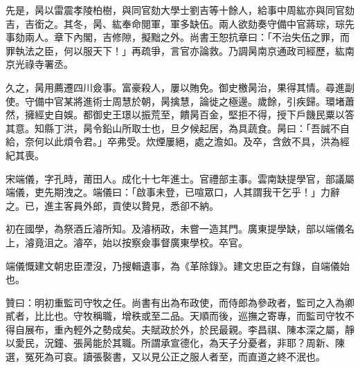 \begin{pinyinscope}
先是，昺以雷震孝陵柏樹，與同官劾大學士劉吉等十餘人，給事中周紘亦與同官劾吉，吉銜之。其冬，昺、紘奉命閱軍，軍多缺伍。兩人欲劾奏守備中官蔣琮，琮先事劾兩人。章下內閣，吉修隙，擬黜之外。尚書王恕抗章曰：「不治失伍之罪，而罪執法之臣，何以服天下！」再疏爭，言官亦論救。乃調昺南京通政司經歷，紘南京光祿寺署丞。

久之，昺用薦遷四川僉事。富豪殺人，屢以賄免。御史檄昺治，果得其情。尋進副使。守備中官某將進術士周慧於朝，昺擒慧，論徙之極邊。歲餘，引疾歸。環堵蕭然，擁經史自娛。都御史王璟以振荒至，饋昺百金，堅拒不得，授下戶饑民粟以答其意。知縣丁洪，昺令鉛山所取士也，旦夕候起居，為具蔬食。昺曰：「吾誠不自給，奈何以此煩令君。」卒弗受。炊煙屢絕，處之澹如。及卒，含斂不具，洪為經紀其喪。

宋端儀，字孔時，莆田人。成化十七年進士。官禮部主事。雲南缺提學官，部議屬端儀，吏先期洩之。端儀曰：「啟事未登，已喧眾口，人其謂我干乞乎！」力辭之。已，進主客員外郎，貢使以贄見，悉卻不納。

初在國學，為祭酒丘濬所知。及濬柄政，未嘗一造其門。廣東提學缺，部以端儀名上，濬竟沮之。濬卒，始以按察僉事督廣東學校。卒官。

端儀慨建文朝忠臣湮沒，乃搜輯遺事，為《革除錄》。建文忠臣之有錄，自端儀始也。

贊曰：明初重監司守牧之任。尚書有出為布政使，而侍郎為參政者，監司之入為卿貳者，比比也。守牧稱職，增秩或至二品。天順而後，巡撫之寄專，而監司守牧不得自展布，重內輕外之勢成矣。夫賦政於外，於民最親。李昌祺、陳本深之屬，靜以愛民，況鐘、張昺能於其職。所謂承宣德化，為天子分憂者，非耶？周新、陳選，冤死為可哀。讀張褧書，又以見公正之服人者至，而直道之終不泯也。


\end{pinyinscope}